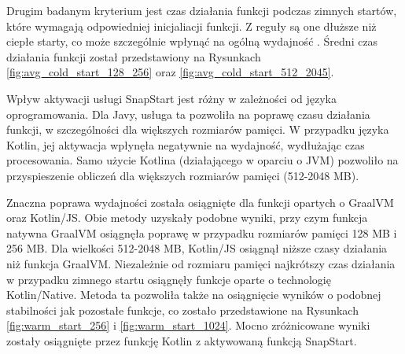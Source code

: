 \begin{figure}[htbp]
\begin{minipage}[t]{0.48\textwidth}
        \label{fig:cold_start_256} %
    \end{minipage}
\end{figure}

Drugim badanym kryterium jest czas działania funkcji podczas zimnych startów, które wymagają odpowiedniej inicjaliacji funkcji.
Z reguły są one dłuższe niż ciepłe starty, co może szczególnie wpłynąć na ogólną wydajność \cite{9284261}\cite{8605777}.
Średni czas działania funkcji został przedstawiony na Rysunkach \ref{fig:avg_cold_start_128_256} oraz \ref{fig:avg_cold_start_512_2045}.

Wpływ aktywacji usługi SnapStart jest różny w zależności od języka oprogramowania.
Dla Javy, usługa ta pozwoliła na poprawę czasu działania funkcji, w szczególności dla większych rozmiarów pamięci.
W przypadku języka Kotlin, jej aktywacja wpłynęła negatywnie na wydajność, wydłużając czas procesowania.
Samo użycie Kotlina (działającego w oparciu o JVM) pozwoliło na przyspieszenie obliczeń dla większych rozmiarów pamięci (512-2048 MB).

Znaczna poprawa wydajności została osiągnięte dla funkcji opartych o GraalVM oraz Kotlin/JS.
Obie metody uzyskały podobne wyniki, przy czym funkcja natywna GraalVM osiągnęła poprawę w przypadku rozmiarów pamięci 128 MB i 256 MB.
Dla wielkości 512-2048 MB, Kotlin/JS osiągnął niższe czasy działania niż funkcja GraalVM.
Niezależnie od rozmiaru pamięci najkrótszy czas działania w przypadku zimnego startu osiągnęły funkcje oparte o technologię Kotlin/Native.
Metoda ta pozwoliła także na osiągnięcie wyników o podobnej stabilności jak pozostałe funkcje, co zostało przedstawione na Rysunkach \ref{fig:warm_start_256} i \ref{fig:warm_start_1024}.
Mocno zróżnicowane wyniki zostały osiągnięte przez funkcję Kotlin z aktywowaną funkcją SnapStart.

